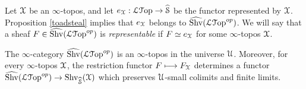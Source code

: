 \begin{example}\label{stup}
Let $\calX$ be an $\infty$-topos, and let $e_{\calX}: \LGeom \rightarrow \widehat{\SSet}$ be the functor
represented by $\calX$. Proposition \ref{toadsteal} implies that $e_{\calX}$ belongs to
$\widehat{\Shv}( \LGeom^{op} )$. We will say that a sheaf $F \in \widehat{\Shv}( \LGeom^{op} )$ is
{\it representable} if $F \simeq e_{\calX}$ for some $\infty$-topos $\calX$.
\end{example}

\begin{lemma}\label{kumba}
The $\infty$-category $\widehat{\Shv}( \LGeom^{op} )$ is an $\infty$-topos in the universe $\calU$.
Moreover, for every $\infty$-topos $\calX$, the restriction functor
$F \mapsto F_{\calX}$ determines a functor $\widehat{\Shv}(\LGeom^{op}) \rightarrow
\Shv_{ \widehat{\SSet} }(\calX)$ which preserves $\calU$-small colimits and finite limits.
\end{lemma}

